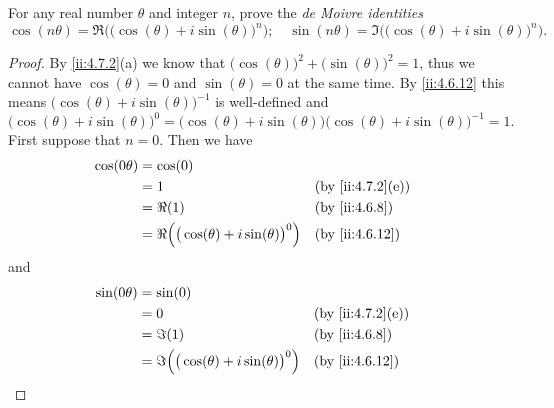 \begin{ex}\label{ii:ex:4.7.7}
  For any real number \(\theta\) and integer \(n\), prove the \emph{de Moivre identities}
  \[
    \cos(n \theta) = \Re\Big(\big(\cos(\theta) + i \sin(\theta)\big)^n\Big); \quad \sin(n \theta) = \Im\Big(\big(\cos(\theta) + i \sin(\theta)\big)^n\Big).
  \]
\end{ex}

\begin{proof}
  By \cref{ii:4.7.2}(a) we know that \(\big(\cos(\theta)\big)^2 + \big(\sin(\theta)\big)^2 = 1\), thus we cannot have \(\cos(\theta) = 0\) and \(\sin(\theta) = 0\) at the same time.
  By \cref{ii:4.6.12} this means \(\big(\cos(\theta) + i \sin(\theta)\big)^{-1}\) is well-defined and
  \[
    \big(\cos(\theta) + i \sin(\theta)\big)^0 = \big(\cos(\theta) + i \sin(\theta)\big) \big(\cos(\theta) + i \sin(\theta)\big)^{-1} = 1.
  \]
  First suppose that \(n = 0\).
  Then we have
  \begin{align*}
    \cos(0 \theta) & = \cos(0)                                                                      \\
                   & = 1                                                      &  & \by{ii:4.7.2}[e] \\
                   & = \Re(1)                                                 &  & \by{ii:4.6.8}    \\
                   & = \Re\Big(\big(\cos(\theta) + i \sin(\theta)\big)^0\Big) &  & \by{ii:4.6.12}
  \end{align*}
  and
  \begin{align*}
    \sin(0 \theta) & = \sin(0)                                                                      \\
                   & = 0                                                      &  & \by{ii:4.7.2}[e] \\
                   & = \Im(1)                                                 &  & \by{ii:4.6.8}    \\
                   & = \Im\Big(\big(\cos(\theta) + i \sin(\theta)\big)^0\Big) &  & \by{ii:4.6.12}
  \end{align*}


\end{proof}
